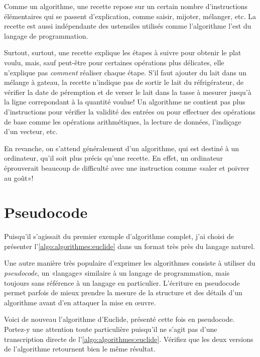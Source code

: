 Comme un algorithme, une recette repose sur un certain nombre
d'instructions élémentaires qui se passent d'explication, comme
saisir, mijoter, mélanger, etc. La recette est aussi indépendante des
ustensiles utilisés comme l'algorithme l'est du langage de
programmation.

Surtout, surtout, une recette explique les étapes à suivre pour
obtenir le plat voulu, mais, sauf peut-être pour certaines opérations
plus délicates, elle n'explique pas \emph{comment} réaliser chaque
étape. S'il faut ajouter du lait dans un mélange à gateau, la recette
n'indique pas de sortir le lait du réfrigérateur, de vérifier la date
de péremption et de verser le lait dans la tasse à mesurer jusqu'à la
ligne correpondant à la quantité voulue! Un algorithme ne contient pas
plus d'instructions pour vérifier la validité des entrées ou pour
effectuer des opérations de base comme les opérations arithmétiques,
la lecture de données, l'indiçage d'un vecteur, etc.

En revanche, on s'attend généralement d'un algorithme, qui est destiné
à un ordinateur, qu'il soit plus précis qu'une recette. En effet, un
ordinateur éprouverait beaucoup de difficulté avec une instruction
comme «saler et poivrer au goût»!



\section{Pseudocode}
\label{sec:algorithmes:pseudocode}

Puisqu'il s'agissait du premier exemple d'algorithme complet, j'ai
choisi de présenter l'\autoref{algo:algorithmes:euclide} dans un
format très près du langage naturel.

Une autre manière très populaire d'exprimer les algorithmes consiste à
utiliser du \emph{pseudocode}, un «langage»
similaire à un langage de programmation, mais toujours sans référence
à un langage en particulier. L'écriture en pseudocode permet parfois
de mieux prendre la mesure de la structure et des détails d'un
algorithme avant d'en attaquer la mise en œuvre.

Voici de nouveau l'algorithme
d'Euclide, présenté cette fois en pseudocode. Portez-y une attention
toute particulière puisqu'il ne s'agit pas d'une transcription directe
de l'\autoref{algo:algorithmes:euclide}. Vérifiez que les deux
versions de l'algorithme retournent bien le même résultat.

